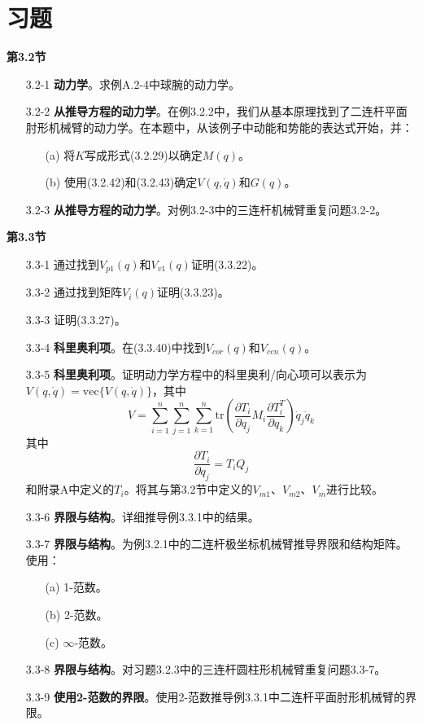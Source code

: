 \documentclass[12pt,a4paper]{ctexart}
\begin{document}
\section{习题}

\textbf{第3.2节}

\begin{enumerate}
\item[3.2-1] \textbf{动力学}。求例A.2-4中球腕的动力学。

\item[3.2-2] \textbf{从推导方程的动力学}。在例3.2.2中，我们从基本原理找到了二连杆平面肘形机械臂的动力学。在本题中，从该例子中动能和势能的表达式开始，并：
\begin{enumerate}
\item[(a)] 将$K$写成形式(3.2.29)以确定$M(q)$。
\item[(b)] 使用(3.2.42)和(3.2.43)确定$V(q,\dot{q})$和$G(q)$。
\end{enumerate}

\item[3.2-3] \textbf{从推导方程的动力学}。对例3.2-3中的三连杆机械臂重复问题3.2-2。
\end{enumerate}

\textbf{第3.3节}

\begin{enumerate}
\item[3.3-1] 通过找到$V_{p1}(q)$和$V_{v1}(q)$证明(3.3.22)。

\item[3.3-2] 通过找到矩阵$V_i(q)$证明(3.3.23)。

\item[3.3-3] 证明(3.3.27)。

\item[3.3-4] \textbf{科里奥利项}。在(3.3.40)中找到$V_{cor}(q)$和$V_{cen}(q)$。

\item[3.3-5] \textbf{科里奥利项}。证明动力学方程中的科里奥利/向心项可以表示为$V(q,\dot{q}) = \text{vec}\{V(q,\dot{q})\}$，其中
\[ V = \sum_{i=1}^{n} \sum_{j=1}^{n} \sum_{k=1}^{n} \text{tr}\left(\frac{\partial T_i}{\partial q_j}M_i\frac{\partial T_i^T}{\partial q_k}\right)\dot{q}_j\dot{q}_k \]
其中
\[ \frac{\partial T_i}{\partial q_j} = T_i Q_j \]
和附录A中定义的$T_i$。将其与第3.2节中定义的$V_{m1}$、$V_{m2}$、$V_m$进行比较。

\item[3.3-6] \textbf{界限与结构}。详细推导例3.3.1中的结果。

\item[3.3-7] \textbf{界限与结构}。为例3.2.1中的二连杆极坐标机械臂推导界限和结构矩阵。使用：
\begin{enumerate}
\item[(a)] 1-范数。
\item[(b)] 2-范数。
\item[(c)] $\infty$-范数。
\end{enumerate}

\item[3.3-8] \textbf{界限与结构}。对习题3.2.3中的三连杆圆柱形机械臂重复问题3.3-7。

\item[3.3-9] \textbf{使用2-范数的界限}。使用2-范数推导例3.3.1中二连杆平面肘形机械臂的界限。
\end{enumerate}
\end{document}
